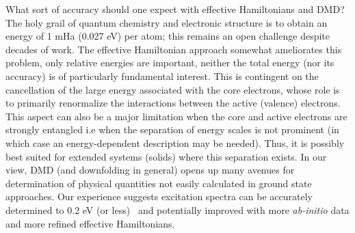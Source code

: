 What sort of accuracy should one expect with effective Hamiltonians and DMD? The holy grail of quantum chemistry 
and electronic structure is to obtain an energy of 1 mHa (0.027 eV) per atom; this 
remains an open challenge despite decades of work. The effective Hamiltonian approach somewhat ameliorates 
this problem, only relative energies are important, neither the total energy (nor its accuracy) is of particularly 
fundamental interest. This is contingent on the cancellation of the large energy associated with the core electrons, 
whose role is to primarily renormalize the interactions between the active (valence) electrons. This aspect can also 
be a major limitation when the core and active electrons are strongly entangled i.e when the separation of energy 
scales is not prominent (in which case an energy-dependent description may be needed). 
Thus, it is possibly best suited for extended systems (solids) where this separation exists. 
In our view, DMD (and downfolding in general) opens up many avenues for determination of physical 
quantities not easily calculated in ground state approaches. Our experience suggests excitation spectra 
can be accurately determined to 0.2 eV (or less)~\cite{Changlani2015} and potentially improved with 
more \emph{ab-initio} data and more refined effective Hamiltonians.  


